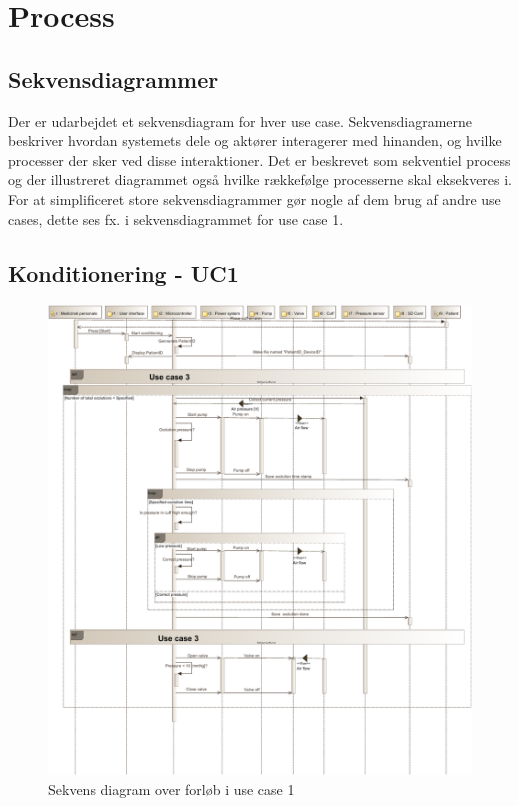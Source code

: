 \newpage
\section{Process}

\subsection{Sekvensdiagrammer}
Der er udarbejdet et sekvensdiagram for hver use case. Sekvensdiagramerne beskriver hvordan systemets dele og aktører interagerer med hinanden, og hvilke processer der sker ved disse interaktioner. Det er beskrevet som sekventiel process og der illustreret diagrammet også hvilke rækkefølge processerne skal eksekveres i. 
For at simplificeret store sekvensdiagrammer gør nogle af dem brug af andre use cases, dette ses fx. i sekvensdiagrammet for use case 1. 

\subsection{Konditionering - UC1} \hfil
\begin{figure}[H]
	\includegraphics[width=\textwidth ]{pdfs/SD_UC1-crop.pdf}
	\caption{Sekvens diagram over forløb i use case 1}
\end{figure}
\newpage

